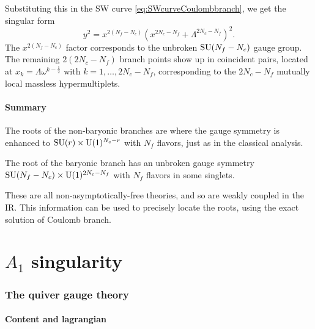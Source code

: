         Substituting this in the SW curve \eqref{eq:SWcurveCoulombbranch}, we get the singular form
        \begin{equation}
            y^2=x^{2(N_f-N_c)}(x^{2N_c-N_f}+\Lambda^{2N_c-N_f})^2.
        \end{equation}
        The $x^{2(N_f-N_c)}$ factor corresponds to the unbroken $\text{SU}(N_f-N_c)$ gauge group. The remaining $2(2N_c-N_f)$ branch points show up in coincident pairs, located at $x_k=\Lambda\omega^{k-\frac{1}{2}}$ with $k=1,\dots,2N_c-N_f$, corresponding to the $2N_c-N_f$ mutually local massless hypermultiplets.

    \subsection{Summary}

        The roots of the non-baryonic branches are where the gauge symmetry is enhanced to $\text{SU}(r)\times\text{U}(1)^{N_c-r}$ with $N_f$ flavors, just as in the classical analysis.

        The root of the baryonic branch has an unbroken gauge symmetry $\text{SU}(N_f-N_c)\times\text{U}(1)^{2N_c-N_f}$ with $N_f$ flavors in some singlets.

        These are all non-asymptotically-free theories, and so are weakly coupled in the IR. This information can be used to precisely locate the roots, using the exact solution of Coulomb branch.


\part{$A_1$ singularity}

\section{The quiver gauge theory}

    \subsection{Content and lagrangian}

